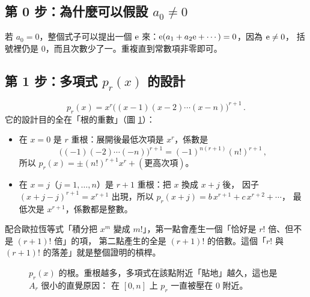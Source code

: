 \subsection{第 0 步：為什麼可以假設 $a_0\neq0$}

若 $a_0=0$，整個式子可以提出一個 $\mathrm{e}$ 來：$\mathrm{e}(a_1+a_2\mathrm{e}+\cdots)=0$，因為 $\mathrm{e}\neq0$，
括號裡仍是 $0$，而且次數少了一。重複直到常數項非零即可。

\subsection{第 1 步：多項式 $p_r(x)$ 的設計}

\[
  p_r(x)=x^{r}\big((x-1)(x-2)\cdots(x-n)\big)^{r+1}\,.
\]
它的設計目的全在「根的重數」（圖 \ref{fig:roots}）：
\begin{itemize}
  \item 在 $x=0$ 是 $r$ 重根：展開後最低次項是 $x^{r}$，係數是
        \[
          \big((-1)(-2)\cdots(-n)\big)^{r+1}=(-1)^{n(r+1)}(n!)^{r+1}\,,
        \]
        所以 $p_r(x)=\pm(n!)^{r+1}x^{r}+(\text{更高次項})$。
  \item 在 $x=j$（$j=1,\ldots,n$）是 $r+1$ 重根：把 $x$ 換成 $x+j$ 後，
        因子 $(x+j-j)^{r+1}=x^{r+1}$ 出現，所以 $p_r(x+j)=b\,x^{r+1}+c\,x^{r+2}+\cdots$，
        最低次是 $x^{r+1}$，係數都是整數。
\end{itemize}
配合歐拉恆等式「積分把 $x^{m}$ 變成 $m!$」，第一點會產生一個「恰好是 $r!$ 倍、但不是 $(r+1)!$ 倍」的項，
第二點產生的全是 $(r+1)!$ 的倍數。這個「$r!$ 與 $(r+1)!$ 的落差」就是整個證明的槓桿。

\begin{figure}[htbp]
\centering
{}
\caption{$p_r(x)$ 的根。重根越多，多項式在該點附近「貼地」越久，這也是 $A_r$ 很小的直覺原因：
在 $[0,n]$ 上 $p_r$ 一直被壓在 $0$ 附近。}
\label{fig:roots}
\end{figure}

